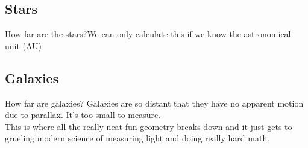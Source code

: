 \documentclass[12pt]{beamer}
\begin{document}
    \subsection{Stars}
        \begin{frame}{How far are the stars?}{We can only calculate this if we know the astronomical unit (AU)}
        \end{frame}
    \subsection{Galaxies}
        \begin{frame}{How far are galaxies?} \centering
            Galaxies are so distant that they have no apparent motion due to parallax. It's too small to measure.\\

            This is where all the really neat fun geometry breaks down and it just gets to grueling modern science of measuring light and doing really hard math.

        \end{frame}
\end{document}
